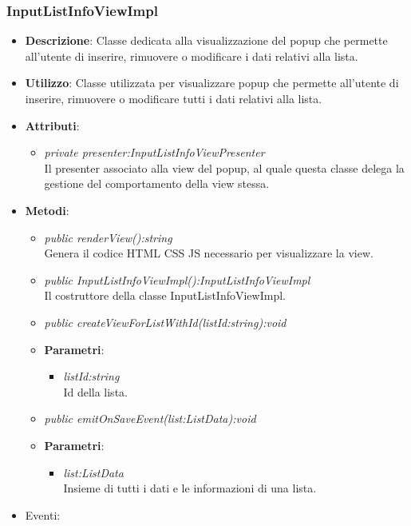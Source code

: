 \subsubsection{InputListInfoViewImpl}
\begin{itemize}
\item \textbf{Descrizione}: Classe dedicata alla visualizzazione del popup che permette all'utente di inserire, rimuovere o modificare i dati relativi alla lista.
\item \textbf{Utilizzo}: Classe utilizzata per visualizzare popup che permette all'utente di inserire, rimuovere o modificare tutti i dati relativi alla lista.
\item \textbf{Attributi}: 
	\begin{itemize}
	\item \textit{private presenter:InputListInfoViewPresenter}\\
		Il presenter associato alla view del popup, al quale questa classe delega la gestione del comportamento della view stessa.
	\end{itemize}
\item \textbf{Metodi}:
	\begin{itemize}	
	\item \textit{public renderView():string}\\
			Genera il codice HTML CSS JS necessario per visualizzare la view.
	\item \textit{public InputListInfoViewImpl():InputListInfoViewImpl}\\
	Il costruttore della classe InputListInfoViewImpl.
	\item \textit{public createViewForListWithId(listId:string):void}\\
	
			\item{\textbf{Parametri}: \begin{itemize}
			\item \textit{listId:string}\\
			Id della lista.
			\end{itemize}}
	\item \textit{public emitOnSaveEvent(list:ListData):void}\\

			\item{\textbf{Parametri}: \begin{itemize}
			\item \textit{list:ListData}\\
				Insieme di tutti i dati e le informazioni di una lista.
			\end{itemize}}
	\end{itemize}
\item{Eventi}:
\end{itemize}

